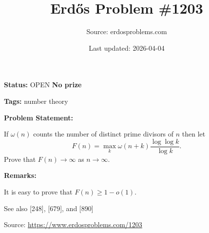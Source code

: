 \documentclass{article}
\title{Erd\H{o}s Problem \#1203}
\date{Last updated: 2026-04-04}
\author{Source: erdosproblems.com}
\begin{document}
\maketitle

\noindent\textbf{Status:} OPEN \quad \textbf{No prize}

\noindent\textbf{Tags:} number theory

\medskip
\noindent\textbf{Problem Statement:}

If $\omega(n)$ counts the number of distinct prime divisors of $n$ then let\[F(n)=\max_k \omega(n+k)\frac{\log\log k}{\log k}.\]Prove that $F(n)\to \infty$ as $n\to \infty$.

\bigskip
\noindent\textbf{Remarks:}

It is easy to prove that $F(n)\geq 1-o(1)$. 

See also [248], [679], and [890]

\bigskip
\noindent\small{Source: \url{https://www.erdosproblems.com/1203}}
\end{document}
